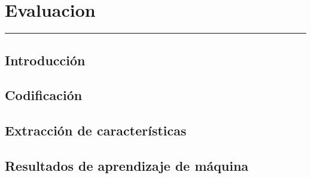 
\chapter{Evaluacion}\label{capit:cap4}
\vspace{-2.0325ex}%
\noindent
\rule{\textwidth}{0.5pt}
\vspace{-5.5ex}%
\newcommand{\pushline}{\Indp}%

\section{Introducci\'on}\label{cap4:intro}

\section{Codificaci\'on}

\section{Extracci\'on de caracter\'isticas}

\section{Resultados de aprendizaje de m\'aquina}
\newpage
